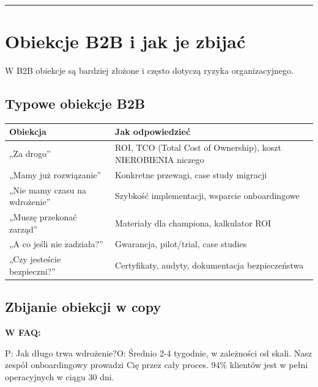 \documentclass[
  12pt,
  a4paper,
  twoside,
  openright,
  12pt,
  DIV=12,
  BCOR=12mm]{scrbook}
\newcommand{\decoline}{%
  \begin{center}
    \textcolor{bordergray}{\rule{0.3\textwidth}{0.5pt}}
  \end{center}
}
\begin{document}
\decoline

\section{Obiekcje B2B i jak je
zbijać}\label{obiekcje-b2b-i-jak-je-zbijaux107}

W B2B obiekcje są bardziej złożone i często dotyczą ryzyka
organizacyjnego.

\subsection{Typowe obiekcje B2B}\label{typowe-obiekcje-b2b}

\begin{longtable}[]{@{}
  >{\raggedright\arraybackslash}p{}
  >{\raggedright\arraybackslash}p{}@{}}
\toprule\noalign{}
\begin{minipage}[b]{\linewidth}\raggedright
Obiekcja
\end{minipage} & \begin{minipage}[b]{\linewidth}\raggedright
Jak odpowiedzieć
\end{minipage} \\
\midrule\noalign{}
\endhead
\bottomrule\noalign{}
\endlastfoot
„Za drogo'' & ROI, TCO (Total Cost of Ownership), koszt NIEROBIENIA
niczego \\
„Mamy już rozwiązanie'' & Konkretne przewagi, case study migracji \\
„Nie mamy czasu na wdrożenie'' & Szybkość implementacji, wsparcie
onboardingowe \\
„Muszę przekonać zarząd'' & Materiały dla championa, kalkulator ROI \\
„A co jeśli nie zadziała?'' & Gwarancja, pilot/trial, case studies \\
„Czy jesteście bezpieczni?'' & Certyfikaty, audyty, dokumentacja
bezpieczeństwa \\
\end{longtable}

\subsection{Zbijanie obiekcji w copy}\label{zbijanie-obiekcji-w-copy}

\textbf{W FAQ:}

P: Jak długo trwa wdrożenie?\newline O: Średnio 2-4 tygodnie, w
zależności od skali. Nasz zespół onboardingowy prowadzi Cię przez cały
proces. 94\% klientów jest w pełni operacyjnych w ciągu 30 dni.
\end{document}
